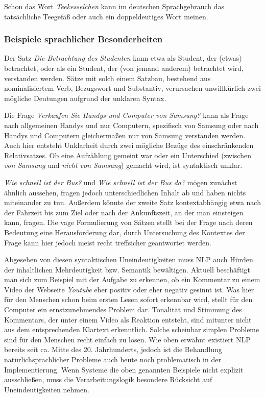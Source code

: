 \documentclass[12pt]{report}
\begin{document}
Schon das Wort \textit{Teekesselchen} kann im deutschen Sprachgebrauch das tatsächliche Teegefäß oder auch ein doppeldeutiges Wort meinen. 
\subsubsection{Beispiele sprachlicher Besonderheiten}

Der Satz \textit{\glqq   Die Betrachtung des Studenten\grqq{}} kann etwa als Student, der (etwas) betrachtet, oder als ein Student, der (von jemand anderem) betrachtet wird, verstanden werden. Sätze mit solch einem Satzbau, bestehend aus nominalisiertem Verb, Bezugswort und Substantiv, verursachen unwillkürlich zwei mögliche Deutungen aufgrund der unklaren Syntax.

Die Frage \textit{\glqq  Verkaufen Sie Handys und Computer von Samsung?\grqq{}} kann als Frage nach allgemeinen Handys und nur Computern, spezifisch von Samsung oder nach Handys und Computern gleichermaßen nur von Samsung verstanden werden. Auch hier entsteht Unklarheit durch zwei mögliche Bezüge des einschränkenden Relativsatzes. Ob eine Aufzählung gemeint war oder ein Unterschied (zwischen \textit{von Samsung} und \textit{nicht von Samsung}) gemacht wird, ist syntaktisch unklar.

\textit{\glqq  Wie schnell ist der Bus?\grqq{}} und \textit{\glqq  Wie schnell ist der Bus da?\grqq{}} mögen zunächst ähnlich aussehen, fragen jedoch unterschiedlichen Inhalt ab und haben nichts miteinander zu tun. Außerdem könnte der zweite Satz kontextabhängig etwa nach der Fahrzeit bis zum Ziel oder nach der Ankunftszeit, an der man einsteigen kann, fragen. Die vage Formulierung von Sätzen stellt bei der Frage nach deren Bedeutung eine Herausforderung dar, durch Untersuchung des Kontextes der Frage kann hier jedoch meist recht treffsicher geantwortet werden.

Abgesehen von diesen syntaktischen Uneindeutigkeiten muss NLP auch Hürden der inhaltlichen Mehrdeutigkeit bzw. Semantik bewältigen. Aktuell beschäftigt man sich zum Beispiel mit der Aufgabe zu erkennen, ob ein Kommentar zu einem Video der Webseite \textit{Youtube} eher positiv oder eher negativ gesinnt ist. Was hier für den Menschen schon beim ersten Lesen sofort erkennbar wird, stellt für den Computer ein ernstzunehmendes Problem dar. Tonalität und Stimmung des Kommentars, der unter einem Video als Reaktion entsteht, sind mitunter nicht aus dem entsprechenden Klartext erkenntlich. 
Solche scheinbar simplen Probleme sind für den Menschen recht einfach zu lösen. Wie oben erwähnt existiert NLP bereits seit ca. Mitte des 20. Jahrhunderts, jedoch ist die Behandlung natürlichsprachlicher Probleme auch heute noch problematisch in der Implementierung. Wenn Systeme die oben genannten Beispiele nicht explizit ausschließen, muss die Verarbeitungslogik besondere Rücksicht auf Uneindeutigkeiten nehmen.
\end{document}
